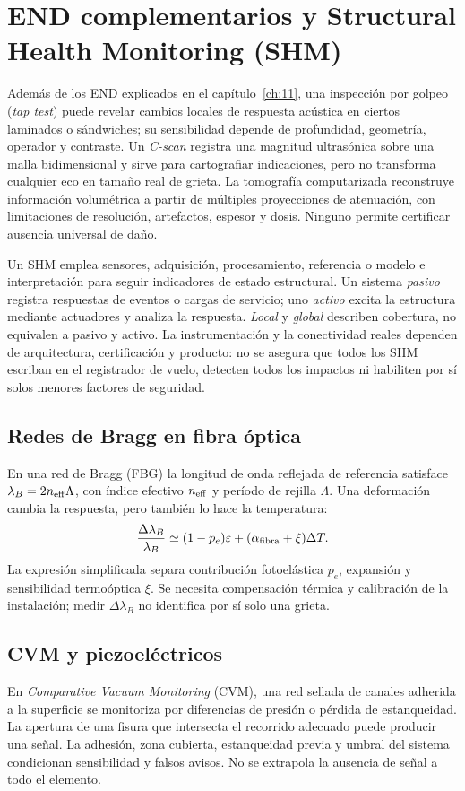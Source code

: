 \section{END complementarios y Structural Health Monitoring (SHM)}
Además de los END explicados en el capítulo~\ref{ch:11}, una inspección por golpeo (\emph{tap test}) puede revelar cambios locales de respuesta acústica en ciertos laminados o sándwiches; su sensibilidad depende de profundidad, geometría, operador y contraste. Un \emph{C-scan} registra una magnitud ultrasónica sobre una malla bidimensional y sirve para cartografiar indicaciones, pero no transforma cualquier eco en tamaño real de grieta. La tomografía computarizada reconstruye información volumétrica a partir de múltiples proyecciones de atenuación, con limitaciones de resolución, artefactos, espesor y dosis. Ninguno permite certificar ausencia universal de daño.

Un SHM emplea sensores, adquisición, procesamiento, referencia o modelo e interpretación para seguir indicadores de estado estructural. Un sistema \emph{pasivo} registra respuestas de eventos o cargas de servicio; uno \emph{activo} excita la estructura mediante actuadores y analiza la respuesta. \emph{Local} y \emph{global} describen cobertura, no equivalen a pasivo y activo. La instrumentación y la conectividad reales dependen de arquitectura, certificación y producto: no se asegura que todos los SHM escriban en el registrador de vuelo, detecten todos los impactos ni habiliten por sí solos menores factores de seguridad.

\subsection{Redes de Bragg en fibra óptica}
En una red de Bragg (FBG) la longitud de onda reflejada de referencia satisface $\lambda_B=2n_{\rm eff}\Lambda$, con índice efectivo $n_{\rm eff}$ y período de rejilla $\Lambda$. Una deformación cambia la respuesta, pero también lo hace la temperatura:
\[
\frac{\Delta\lambda_B}{\lambda_B}\simeq(1-p_e)\varepsilon+
(\alpha_{\rm fibra}+\xi)\Delta T.
\]
La expresión simplificada separa contribución fotoelástica $p_e$, expansión y sensibilidad termoóptica $\xi$. Se necesita compensación térmica y calibración de la instalación; medir $\Delta\lambda_B$ no identifica por sí solo una grieta.

\subsection{CVM y piezoeléctricos}
En \emph{Comparative Vacuum Monitoring} (CVM), una red sellada de canales adherida a la superficie se monitoriza por diferencias de presión o pérdida de estanqueidad. La apertura de una fisura que intersecta el recorrido adecuado puede producir una señal. La adhesión, zona cubierta, estanqueidad previa y umbral del sistema condicionan sensibilidad y falsos avisos. No se extrapola la ausencia de señal a todo el elemento.

